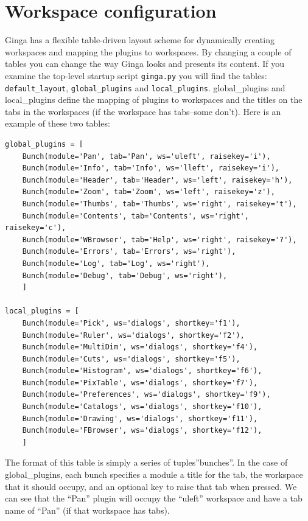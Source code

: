 \documentclass[11pt]{report}
\begin{document}
\section{Workspace configuration}
\label{sec:workspaceconfig}
Ginga has a flexible table-driven layout scheme for dynamically creating
workspaces and mapping the plugins to workspaces.  By changing a couple
of tables you can change the way Ginga looks and presents its content. 
If you examine the top-level startup script {\tt ginga.py} you will find
the tables: {\tt default\_layout}, {\tt global\_plugins} and
{\tt local\_plugins}.
global\_plugins and local\_plugins define the mapping of plugins to
workspaces and the titles on the tabs in the workspaces (if the
workspace has tabs--some don't).  
Here is an example of these two tables:
\begin{lstlisting}
global_plugins = [
    Bunch(module='Pan', tab='Pan', ws='uleft', raisekey='i'),
    Bunch(module='Info', tab='Info', ws='lleft', raisekey='i'),
    Bunch(module='Header', tab='Header', ws='left', raisekey='h'),
    Bunch(module='Zoom', tab='Zoom', ws='left', raisekey='z'),
    Bunch(module='Thumbs', tab='Thumbs', ws='right', raisekey='t'),
    Bunch(module='Contents', tab='Contents', ws='right', raisekey='c'),
    Bunch(module='WBrowser', tab='Help', ws='right', raisekey='?'),
    Bunch(module='Errors', tab='Errors', ws='right'),
    Bunch(module='Log', tab='Log', ws='right'),
    Bunch(module='Debug', tab='Debug', ws='right'),
    ]

local_plugins = [
    Bunch(module='Pick', ws='dialogs', shortkey='f1'),
    Bunch(module='Ruler', ws='dialogs', shortkey='f2'),
    Bunch(module='MultiDim', ws='dialogs', shortkey='f4'), 
    Bunch(module='Cuts', ws='dialogs', shortkey='f5'),
    Bunch(module='Histogram', ws='dialogs', shortkey='f6'),
    Bunch(module='PixTable', ws='dialogs', shortkey='f7'),
    Bunch(module='Preferences', ws='dialogs', shortkey='f9'),
    Bunch(module='Catalogs', ws='dialogs', shortkey='f10'),
    Bunch(module='Drawing', ws='dialogs', shortkey='f11'),
    Bunch(module='FBrowser', ws='dialogs', shortkey='f12'), 
    ]
\end{lstlisting}
The format of this table is simply a series of tuples''bunches''.
In the case of global\_plugins, each bunch specifies a module 
a title for the tab, the workspace that it should occupy, and an
optional key to raise that tab when pressed.
We can see that the ``Pan'' plugin will occupy the ``uleft'' workspace
and have a tab name of ``Pan'' (if that workspace has tabs).
\end{document}
